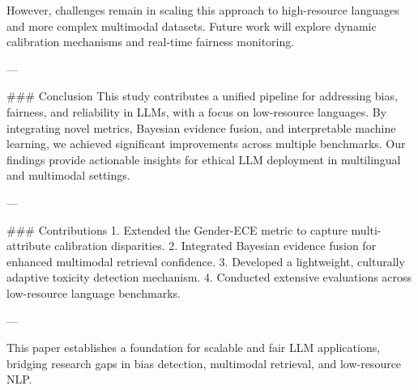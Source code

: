 However, challenges remain in scaling this approach to high-resource languages and more complex multimodal datasets. Future work will explore dynamic calibration mechanisms and real-time fairness monitoring.

---

### Conclusion
This study contributes a unified pipeline for addressing bias, fairness, and reliability in LLMs, with a focus on low-resource languages. By integrating novel metrics, Bayesian evidence fusion, and interpretable machine learning, we achieved significant improvements across multiple benchmarks. Our findings provide actionable insights for ethical LLM deployment in multilingual and multimodal settings.

---

### Contributions
1. Extended the Gender-ECE metric to capture multi-attribute calibration disparities.
2. Integrated Bayesian evidence fusion for enhanced multimodal retrieval confidence.
3. Developed a lightweight, culturally adaptive toxicity detection mechanism.
4. Conducted extensive evaluations across low-resource language benchmarks.

--- 

This paper establishes a foundation for scalable and fair LLM applications, bridging research gaps in bias detection, multimodal retrieval, and low-resource NLP.